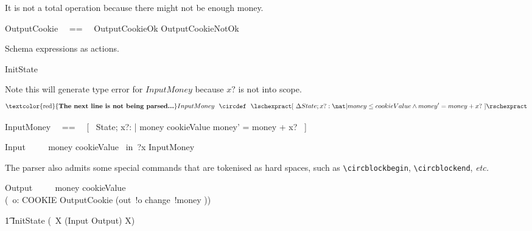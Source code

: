 \documentclass{article}
\begin{document}
It is not a total operation because there might not be enough money.
%
\begin{zed}
   OutputCookie ~~==~~ OutputCookieOk \lor OutputCookieNotOk
\end{zed}

Schema expressions as actions.
%
\begin{circusaction}   
    InitState ~~\circdef~~ \lschexpract [~ State~' | money' = 0 \land quantity' = cookieQuantity ~] \rschexpract
\end{circusaction}

Note this will generate type error for $InputMoney$ because $x?$ is not into scope.
%
\[
\mbox{\textcolor{red}{\textbf{The next line is not being parsed...}}} \\
    InputMoney ~~\circdef~~ \lschexpract [~ \Delta State; x?: \nat | money \leq cookieValue \land money' = money + x? ~] \rschexpract
\]
%
\begin{zed}
    InputMoney ~~==~~ [~ \Delta State; x?: \nat | money \leq cookieValue \land money' = money + x? ~]
\end{zed}

\begin{circusaction}
   Input ~~\circdef~~ \lcircguard money \leq cookieValue \rcircguard  \circguard\ in~?x \then \lschexpract InputMoney \rschexpract \\
\end{circusaction}

The parser also admits some special commands that are tokenised as hard spaces, such as \verb'\circblockbegin', \verb'\circblockend', \textit{etc.}
%
\begin{circusaction}    
    Output ~~\circdef~~ 
        \circblockbegin
            \lcircguard money \geq cookieValue \rcircguard \circguard\ \\
            (\circvar\ o: COOKIE \circspot \lschexpract OutputCookie \rschexpract \circseq (out~!o \then change~!money \then \Skip))
        \circblockend
\end{circusaction}

\begin{circusaction}
   \t1 \circspot InitState \circseq (\circmu\ X \circspot (Input \extchoice Output) \circseq X)
\end{circusaction}

\begin{circus}
   \circend
\end{circus}
\end{document}
